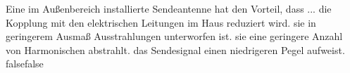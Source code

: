     {Eine im Außenbereich installierte Sendeantenne hat den Vorteil, dass ...}
    {die Kopplung mit den elektrischen Leitungen im Haus reduziert wird.}
    {sie in geringerem Ausmaß Ausstrahlungen unterworfen ist.}
    {sie eine geringere Anzahl von Harmonischen abstrahlt.}
    {das Sendesignal einen niedrigeren Pegel aufweist.}
    {false}{false}